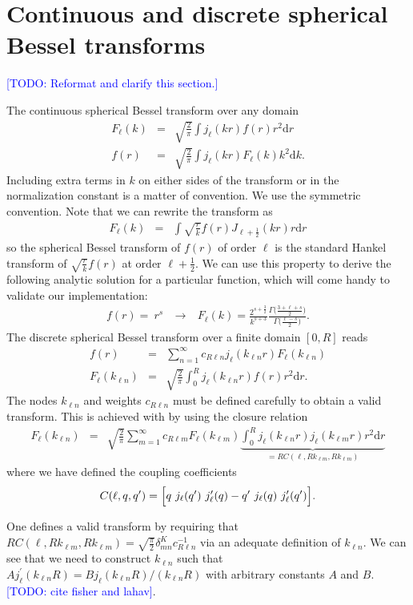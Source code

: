 \documentclass{aastex6}
\renewcommand{\d}{{\mathrm{d}}}
\newcommand{\eqn}[1]{\begin{eqnarray}#1\end{eqnarray}}
\newcommand{\todo}[1]{\textcolor{blue}{[TODO: #1]}}
\begin{document}
\newpage
\appendix
\section{Continuous and discrete spherical Bessel transforms}

\todo{Reformat and clarify this section.}

The continuous spherical Bessel transform over any domain
\eqn{
	F_\ell(k)  &=& \sqrt{\frac{2}{\pi}} \int   j_\ell(k r) f(r) r^2 \d r  \\
	f(r) &=& \sqrt{\frac{2}{\pi}} \int   j_\ell(k r) F_\ell(k) k^2 \d k.
}
Including extra terms in $k$ on either sides of the transform or in the normalization constant is a matter of convention. We use the symmetric convention. Note that we can rewrite the transform as
\eqn{
	F_\ell(k) &=& \int  \sqrt{\frac{r}{k}}f(r)  J_{\ell+\frac{1}{2}}(k r)  r \d r
}
so the spherical Bessel transform of $f(r)$ of order $\ell$ is the standard Hankel transform of $ \sqrt{\frac{r}{k}}f(r)$ at order $\ell+\frac{1}{2}$.
We can use this property to derive the following analytic solution for a particular function, which will come handy to validate our implementation:
\eqn{
	f(r)= \ r^{s}  &\ \longrightarrow \ &		F_\ell(k) = \frac{2^{s+\frac{3}{2}}}{k^{s+3}} \frac{\Gamma\bigl(\frac{3+\ell+s}{2}\bigr)}{\Gamma\bigl(\frac{\ell-s}{2}\bigr)}.
}
The discrete spherical Bessel transform over a finite domain $[0, R]$ reads
\eqn{ 
	f(r) &=& \sum_{n=1}^\infty  c_{R \ell n}  j_\ell(k_{\ell n} r) F_\ell(k_{\ell n}) \\
	F_\ell(k_{\ell n}) &=& \sqrt{\frac{2}{\pi}} \int_0^R   j_\ell(k_{\ell n} r) f(r) r^2 \d r .
}
The nodes $k_{\ell n}$ and weights $c_{R \ell n}$ must be defined carefully to obtain a valid transform. This is achieved with by using the closure relation
\eqn{
	F_\ell(k_{\ell n}) &=& \sqrt{\frac{2}{\pi}}  \sum_{m=1}^\infty c_{R \ell m}F_\ell(k_{\ell m})  \underbrace{\int_0^R j_\ell(k_{\ell n} r)  j_\ell(k_{\ell m} r) r^2 \d r}_{ = R  C(\ell, Rk_{\ell m}, Rk_{\ell m})}
}	
where we have defined the coupling coefficients
\eqn{
	 C(\ell, q, q^\prime)= \Bigl[ q \ j_\ell( q^\prime ) \ j^\prime_\ell( q ) - q^\prime \ j_\ell( q) \ j^\prime_\ell( q^\prime )    \Bigr].
}

One defines a valid transform by requiring that $  R  C(\ell, Rk_{\ell m}, Rk_{\ell m})= \sqrt{\frac{\pi}{2}} \delta^K_{m n} c^{-1}_{R\ell n}$ via an adequate definition of $k_{\ell n}$. We can see that we need to construct  $k_{\ell n}$ such that $A j^\prime_\ell( k_{\ell n} R) = B j_\ell( k_{\ell n} R)  / ( k_{\ell n} R)$ with arbitrary constants $A$ and $B$.  
\todo{cite fisher and lahav}. 
\end{document}
